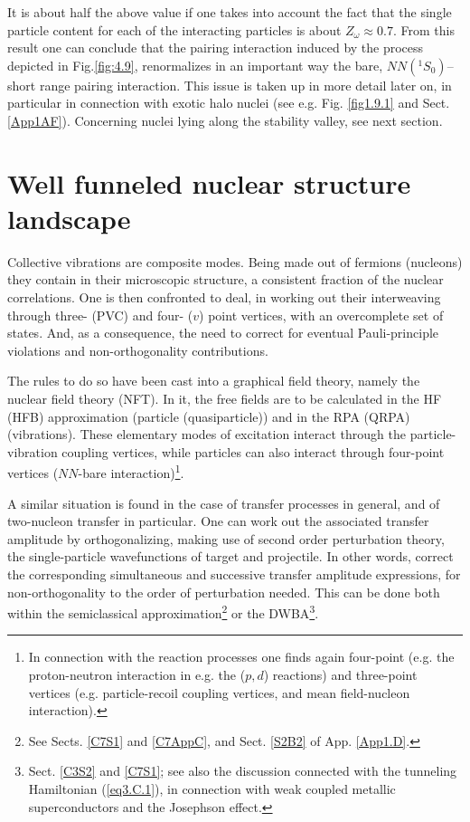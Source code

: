 It is about half the above value if one takes into account the fact that the single particle content  for each of the interacting particles is about $Z_\omega\approx0.7$. From this result one can conclude that the pairing interaction induced by the process depicted in Fig.\ref{fig:4.9}, renormalizes in an important way the bare, $NN(^1S_0)$--short range pairing interaction. This issue is taken up in more detail later on, in particular in connection with exotic halo nuclei (see e.g. Fig. \ref{fig1.9.1} and Sect. \ref{App1AF}). Concerning nuclei lying along the stability valley, see next section.

\section{Well funneled nuclear structure landscape}\label{C1S4}
Collective vibrations are composite modes. Being made out of fermions (nucleons) they contain in their microscopic structure, a consistent fraction of the nuclear correlations. One is  then confronted to deal, in working out their interweaving through three- (PVC) and four- ($v$) point vertices, with an overcomplete set of states. And, as a consequence, the need to correct for eventual Pauli-principle violations and non-orthogonality contributions.

 The rules to do so have been cast into a graphical  field theory, namely the nuclear field theory (NFT). In it, the free fields are to be calculated in the HF (HFB) approximation (particle (quasiparticle)) and in the RPA (QRPA) (vibrations). These elementary modes of excitation interact through the particle-vibration coupling vertices, while particles can also interact through four-point vertices ($NN$-bare interaction)\footnote{In connection with the reaction processes one finds again four-point  (e.g. the proton-neutron interaction in e.g. the ($p,d$) reactions) and three-point vertices (e.g. particle-recoil coupling vertices, and mean field-nucleon interaction).}.

A similar situation is found in the case of transfer processes in general, and of two-nucleon transfer in particular. One can work out the associated transfer amplitude by orthogonalizing, making use of second order perturbation theory, the single-particle wavefunctions of target and projectile. In other words, correct the corresponding simultaneous and successive transfer amplitude expressions, for non-orthogonality to the order of perturbation needed. This can be done both within the semiclassical approximation\footnote{See Sects. \ref{C7S1} and \ref{C7AppC}, and  Sect. \ref{S2B2} of App. \ref{App1.D}.}  or the  DWBA\footnote{Sect. \ref{C3S2} and \ref{C7S1}; see also the discussion connected with the  tunneling Hamiltonian (\ref{eq3.C.1}), in connection with weak coupled metallic superconductors and  the Josephson effect.}. 

